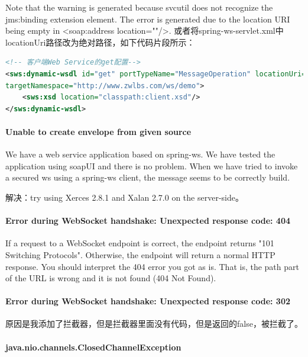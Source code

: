 \documentclass{book}
\begin{document}
Note that the warning is generated because svcutil does not recognize the
jms:binding extension element.
The error is generated due to the location URI being empty in <soap:address
location=""/>.
或者将spring-ws-servlet.xml中locationUri路径改为绝对路径，如下代码片段所示：

\begin{lstlisting}[language=XML]
<!-- 客户端Web Service的get配置-->
<sws:dynamic-wsdl id="get" portTypeName="MessageOperation" locationUri="http://192.168.24.79:9090/clbs/webservice/get.wsdl"
targetNamespace="http://www.zwlbs.com/ws/demo">
	<sws:xsd location="classpath:client.xsd"/>
</sws:dynamic-wsdl>
\end{lstlisting}


\paragraph{Unable to create envelope from given source}

We have a web service application based on spring-ws. 
We have tested the application using soapUI and there is no problem. 
When we have tried to invoke a secured ws using a spring-ws client, the message seems to be correctly build.

解决：try using Xerces 2.8.1 and Xalan 2.7.0 on the server-side。

\paragraph{Error during WebSocket handshake: Unexpected response code: 404}

If a request to a WebSocket endpoint is correct, 
the endpoint returns "101 Switching Protocols". 
Otherwise, the endpoint will return a normal HTTP response.
You should interpret the 404 error you got as is. That is, 
the path part of the URL is wrong and it is not found (404 Not Found).

\paragraph{Error during WebSocket handshake: Unexpected response code: 302}
原因是我添加了拦截器，但是拦截器里面没有代码，但是返回的false，被拦截了。


\paragraph{java.nio.channels.ClosedChannelException}
\end{document}
